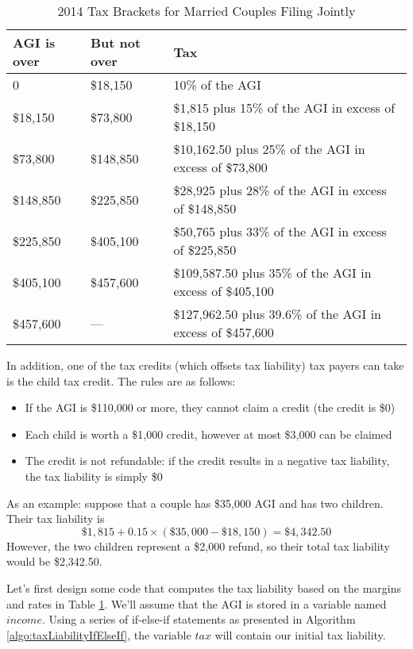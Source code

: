 \begin{table}[H]
\centering
\begin{tabular}{|l|l|p{}|}
\hline
AGI is over & But not over & Tax \\
\hline\hline
0 & \$18,150 & 10\% of the AGI\\
\hline
\$18,150 & \$73,800 & \$1,815 plus 15\% of the AGI in excess of \$18,150\\
\hline
\$73,800 & \$148,850 & \$10,162.50 plus 25\% of the AGI in excess of \$73,800\\
\hline
\$148,850 & \$225,850 & \$28,925 plus 28\% of the AGI in excess of \$148,850\\
\hline
\$225,850 & \$405,100 & \$50,765 plus 33\% of the AGI in excess of \$225,850\\
\hline
\$405,100 & \$457,600 & \$109,587.50 plus 35\% of the AGI in excess of \$405,100\\
\hline
\$457,600 & --- & \$127,962.50 plus 39.6\% of the AGI in excess of \$457,600\\
\hline
\end{tabular}
\caption{2014 Tax Brackets for Married Couples Filing Jointly}
\label{table:taxBrackets}
\end{table}

In addition, one of the tax credits (which offsets tax liability) tax payers can take 
is the child tax credit.  The rules are as follows:
\begin{itemize}
  \item If the AGI is \$110,000 or more, they cannot claim a credit (the credit is \$0)
  \item Each child is worth a \$1,000 credit, however at most \$3,000 can be claimed
  \item The credit is not refundable: if the credit results in a negative tax liability, the tax liability is simply \$0
\end{itemize}

As an example: suppose that a couple has \$35,000 AGI and has two children.  Their tax liability is
$$\$1,815 + 0.15 \times (\$35,000 - \$18,150) = \$4,342.50$$
However, the two children represent a \$2,000 refund, so their total tax liability would be \$2,342.50.

Let's first design some code that computes the tax liability based on the margins and
rates in Table \ref{table:taxBrackets}.  We'll assume that the AGI is stored in a variable
named $income$.  Using a series of if-else-if statements as presented in  Algorithm 
\ref{algo:taxLiabilityIfElseIf}, the variable $tax$ will contain our initial tax liability.


